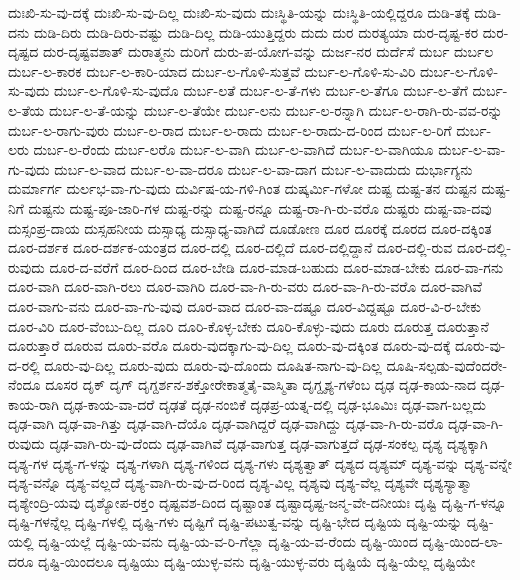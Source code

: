 {ದುಃಖಿ-ಸು-ವು-ದಕ್ಕೆ
ದುಃಖಿ-ಸು-ವು-ದಿಲ್ಲ
ದುಃಖಿ-ಸು-ವುದು
ದುಃಸ್ಥಿತಿ-ಯನ್ನು
ದುಃಸ್ಥಿತಿ-ಯಲ್ಲಿದ್ದರೂ
ದುಡಿ-ತಕ್ಕೆ
ದುಡಿ-ದನು
ದುಡಿ-ದಿರು
ದುಡಿ-ದಿರು-ವಷ್ಟು
ದುಡಿ-ದಿಲ್ಲ
ದುಡಿ-ಯುತ್ತಿದ್ದರು
ದುದು
ದುರ
ದುರತ್ಯಯಾ
ದುರ-ದೃಷ್ಟ-ಕರ
ದುರ-ದೃಷ್ಟದ
ದುರ-ದೃಷ್ಟವಶಾತ್
ದುರಾತ್ಮನು
ದುರಿಗೆ
ದುರು-ಪ-ಯೋಗ-ವನ್ನು
ದುರ್ಜ-ನರ
ದುರ್ದೆಸೆ
ದುರ್ಬ
ದುರ್ಬಲ
ದುರ್ಬ-ಲ-ಕಾರಕ
ದುರ್ಬ-ಲ-ಕಾರಿ-ಯಾದ
ದುರ್ಬ-ಲ-ಗೊಳಿ-ಸುತ್ತವೆ
ದುರ್ಬ-ಲ-ಗೊಳಿ-ಸು-ವಿರಿ
ದುರ್ಬ-ಲ-ಗೊಳಿ-ಸು-ವುದು
ದುರ್ಬ-ಲ-ಗೊಳಿ-ಸು-ವುದೊ
ದುರ್ಬ-ಲತೆ
ದುರ್ಬ-ಲ-ತೆ-ಗಳು
ದುರ್ಬ-ಲ-ತೆಗೂ
ದುರ್ಬ-ಲ-ತೆಗೆ
ದುರ್ಬ-ಲ-ತೆಯ
ದುರ್ಬ-ಲ-ತೆ-ಯನ್ನು
ದುರ್ಬ-ಲ-ತೆಯೇ
ದುರ್ಬ-ಲನು
ದುರ್ಬ-ಲ-ರನ್ನಾಗಿ
ದುರ್ಬ-ಲ-ರಾಗಿ-ರು-ವವ-ರನ್ನು
ದುರ್ಬ-ಲ-ರಾಗು-ವುರು
ದುರ್ಬ-ಲ-ರಾದ
ದುರ್ಬ-ಲ-ರಾದು
ದುರ್ಬ-ಲ-ರಾದು-ದ-ರಿಂದ
ದುರ್ಬ-ಲ-ರಿಗೆ
ದುರ್ಬ-ಲರು
ದುರ್ಬ-ಲ-ರೆಂದು
ದುರ್ಬ-ಲರೊ
ದುರ್ಬ-ಲ-ವಾಗಿ
ದುರ್ಬ-ಲ-ವಾಗಿದೆ
ದುರ್ಬ-ಲ-ವಾಗಿಯೂ
ದುರ್ಬ-ಲ-ವಾ-ಗು-ವುದು
ದುರ್ಬ-ಲ-ವಾದ
ದುರ್ಬ-ಲ-ವಾ-ದರೂ
ದುರ್ಬ-ಲ-ವಾ-ದಾಗ
ದುರ್ಬ-ಲ-ವಾದುದು
ದುರ್ಭಾಗ್ಯನು
ದುರ್ಮಾರ್ಗ
ದುರ್ಲಭ-ವಾ-ಗು-ವುದು
ದುರ್ವಿಷ-ಯ-ಗಳಿ-ಗಿಂತ
ದುಷ್ಕರ್ಮಿ-ಗಳೋ
ದುಷ್ಟ
ದುಷ್ಟ-ತನ
ದುಷ್ಟನ
ದುಷ್ಟ-ನಿಗೆ
ದುಷ್ಟನು
ದುಷ್ಟ-ಪೂ-ಜಾರಿ-ಗಳ
ದುಷ್ಟ-ರನ್ನು
ದುಷ್ಟ-ರನ್ನೂ
ದುಷ್ಟ-ರಾ-ಗಿ-ರು-ವರೊ
ದುಷ್ಟರು
ದುಷ್ಟ-ವಾ-ದವು
ದುಸ್ಸಂಪ್ರ-ದಾಯ
ದುಸ್ಸಹನೀಯ
ದುಸ್ಸಾಧ್ಯ
ದುಸ್ಸಾಧ್ಯ-ವಾಗಿದೆ
ದೂಡೋಣ
ದೂರ
ದೂರಕ್ಕೆ
ದೂರದ
ದೂರ-ದಕ್ಕಿಂತ
ದೂರ-ದರ್ಶಕ
ದೂರ-ದರ್ಶಕ-ಯಂತ್ರದ
ದೂರ-ದಲ್ಲಿ
ದೂರ-ದಲ್ಲಿದೆ
ದೂರ-ದಲ್ಲಿದ್ದಾನೆ
ದೂರ-ದಲ್ಲಿ-ರುವ
ದೂರ-ದಲ್ಲಿ-ರುವುದು
ದೂರ-ದ-ವರೆಗೆ
ದೂರ-ದಿಂದ
ದೂರ-ಬೇಡಿ
ದೂರ-ಮಾಡ-ಬಹುದು
ದೂರ-ಮಾಡ-ಬೇಕು
ದೂರ-ವಾ-ಗನು
ದೂರ-ವಾಗಿ
ದೂರ-ವಾಗಿ-ರಲು
ದೂರ-ವಾಗಿರಿ
ದೂರ-ವಾ-ಗಿ-ರು-ವರು
ದೂರ-ವಾ-ಗಿ-ರು-ವರೊ
ದೂರ-ವಾಗಿವೆ
ದೂರ-ವಾಗು-ವನು
ದೂರ-ವಾ-ಗು-ವುವು
ದೂರ-ವಾದ
ದೂರ-ವಾ-ದಷ್ಟೂ
ದೂರ-ವಿದ್ದಷ್ಟೂ
ದೂರ-ವಿ-ರ-ಬೇಕು
ದೂರ-ವಿರಿ
ದೂರ-ವೆಂಬು-ದಿಲ್ಲ
ದೂರಿ
ದೂರಿ-ಕೊಳ್ಳ-ಬೇಕು
ದೂರಿ-ಕೊಳ್ಳು-ವುದು
ದೂರು
ದೂರುತ್ತ
ದೂರುತ್ತಾನೆ
ದೂರುತ್ತಾರೆ
ದೂರುವ
ದೂರು-ವರೊ
ದೂರು-ವುದಕ್ಕಾಗು-ವು-ದಿಲ್ಲ
ದೂರು-ವು-ದಕ್ಕಿಂತ
ದೂರು-ವು-ದಕ್ಕೆ
ದೂರು-ವು-ದ-ರಲ್ಲಿ
ದೂರು-ವು-ದಿಲ್ಲ
ದೂರು-ವುದು
ದೂರು-ವು-ದೊಂದು
ದೂಷಿತ-ನಾಗು-ವು-ದಿಲ್ಲ
ದೂಷಿ-ಸಲ್ಪಡು-ವುದೆಂದರೇ-ನೆಂದೂ
ದೂಸರ
ದೃಕ್
ದೃಗ್
ದೃಗ್ದರ್ಶನ-ಶಕ್ತೋರೇಕಾತ್ಮತೈ-ವಾಸ್ಮಿತಾ
ದೃಗ್ದೃಶ್ಯ-ಗಳೆಂಬ
ದೃಢ
ದೃಢ-ಕಾಯ-ನಾದ
ದೃಢ-ಕಾಯ-ರಾಗಿ
ದೃಢ-ಕಾಯ-ವಾ-ದರೆ
ದೃಢತೆ
ದೃಢ-ನಂಬಿಕೆ
ದೃಢಪ್ರ-ಯತ್ನ-ದಲ್ಲಿ
ದೃಢ-ಭೂಮಿಃ
ದೃಢ-ವಾಗ-ಬಲ್ಲದು
ದೃಢ-ವಾಗಿ
ದೃಢ-ವಾ-ಗಿತ್ತು
ದೃಢ-ವಾಗಿ-ದೆಯೊ
ದೃಢ-ವಾಗಿದ್ದರೆ
ದೃಢ-ವಾಗಿದ್ದು
ದೃಢ-ವಾ-ಗಿ-ರು-ವರೊ
ದೃಢ-ವಾ-ಗಿ-ರುವುದು
ದೃಢ-ವಾಗಿ-ರು-ವು-ದೆಂದು
ದೃಢ-ವಾಗಿವೆ
ದೃಢ-ವಾಗುತ್ತ
ದೃಢ-ವಾಗುತ್ತದೆ
ದೃಢ-ಸಂಕಲ್ಪ
ದೃಶ್ಯ
ದೃಶ್ಯಕ್ಕಾಗಿ
ದೃಶ್ಯ-ಗಳ
ದೃಶ್ಯ-ಗ-ಳನ್ನು
ದೃಶ್ಯ-ಗಳಾಗಿ
ದೃಶ್ಯ-ಗಳಿಂದ
ದೃಶ್ಯ-ಗಳು
ದೃಶ್ಯತ್ವಾತ್
ದೃಶ್ಯದ
ದೃಶ್ಯಮ್
ದೃಶ್ಯ-ವನ್ನು
ದೃಶ್ಯ-ವನ್ನೇ
ದೃಶ್ಯ-ವನ್ನೊ
ದೃಶ್ಯ-ವಲ್ಲದೆ
ದೃಶ್ಯ-ವಾಗಿ-ರು-ವು-ದ-ರಿಂದ
ದೃಶ್ಯ-ವಿಲ್ಲ
ದೃಶ್ಯವು
ದೃಶ್ಯ-ವೆಲ್ಲ
ದೃಶ್ಯವೇ
ದೃಶ್ಯಸ್ಯಾತ್ಮಾ
ದೃಶ್ಯೇಂದ್ರಿ-ಯವು
ದೃಶ್ಯೋಪ-ರಕ್ತಂ
ದೃಷ್ಟವಶ-ದಿಂದ
ದೃಷ್ಟಾಂತ
ದೃಷ್ಟಾದೃಷ್ಟ-ಜನ್ಮ-ವೇ-ದನೀಯಃ
ದೃಷ್ಟಿ
ದೃಷ್ಟಿ-ಗ-ಳನ್ನೂ
ದೃಷ್ಟಿ-ಗಳನ್ನೆಲ್ಲ
ದೃಷ್ಟಿ-ಗಳಲ್ಲಿ
ದೃಷ್ಟಿ-ಗಳು
ದೃಷ್ಟಿಗೆ
ದೃಷ್ಟಿ-ಪಟುತ್ವ-ವನ್ನು
ದೃಷ್ಟಿ-ಭೇದ
ದೃಷ್ಟಿಯ
ದೃಷ್ಟಿ-ಯನ್ನು
ದೃಷ್ಟಿ-ಯಲ್ಲಿ
ದೃಷ್ಟಿ-ಯಲ್ಲೆ
ದೃಷ್ಟಿ-ಯ-ವನು
ದೃಷ್ಟಿ-ಯ-ವ-ರಿ-ಗೆಲ್ಲಾ
ದೃಷ್ಟಿ-ಯ-ವ-ರೆಂದು
ದೃಷ್ಟಿ-ಯಿಂದ
ದೃಷ್ಟಿ-ಯಿಂದ-ಲಾ-ದರೂ
ದೃಷ್ಟಿ-ಯಿಂದಲೂ
ದೃಷ್ಟಿಯು
ದೃಷ್ಟಿ-ಯುಳ್ಳ-ವನು
ದೃಷ್ಟಿ-ಯುಳ್ಳ-ವರು
ದೃಷ್ಟಿಯೆ
ದೃಷ್ಟಿ-ಯೆಲ್ಲ
ದೃಷ್ಟಿಯೇ
}
